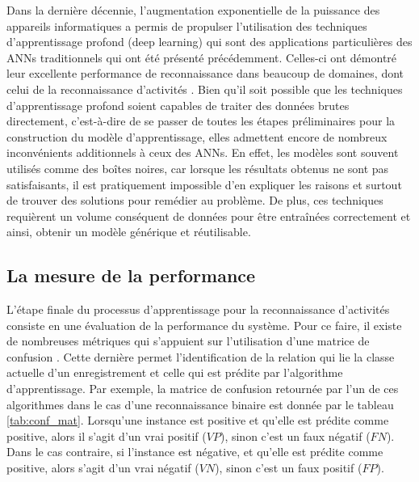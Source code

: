 Dans la dernière décennie, l'augmentation exponentielle de la puissance des appareils informatiques a permis de propulser l'utilisation des techniques d'apprentissage profond (deep learning) qui sont des applications particulières des \acsp{ANN} traditionnels qui ont été présenté précédemment. Celles-ci ont démontré leur excellente performance de reconnaissance dans beaucoup de domaines, dont celui de la reconnaissance d'activités \citep{Yang2015, Li2016, Wang2018}. Bien qu'il soit possible que les techniques d'apprentissage profond soient capables de traiter des données brutes directement, c'est-à-dire de se passer de toutes les étapes préliminaires pour la construction du modèle d'apprentissage, elles admettent encore de nombreux inconvénients additionnels à ceux des \acsp{ANN}. En effet, les modèles sont souvent utilisés comme des boîtes noires, car lorsque les résultats obtenus ne sont pas satisfaisants, il est pratiquement impossible d'en expliquer les raisons et surtout de trouver des solutions pour remédier au problème. De plus, ces techniques requièrent un volume conséquent de données pour être entraînées correctement et ainsi, obtenir un modèle générique et réutilisable.

\subsection{La mesure de la performance}

L'étape finale du processus d'apprentissage pour la reconnaissance d'activités consiste en une évaluation de la performance du système. Pour ce faire, il existe de nombreuses métriques qui s'appuient sur l'utilisation d'une matrice de confusion \citep{Fawcett2006}. Cette dernière permet l'identification de la relation qui lie la classe actuelle d'un enregistrement et celle qui est prédite par l'algorithme d'apprentissage. Par exemple, la matrice de confusion retournée par l'un de ces algorithmes dans le cas d'une reconnaissance binaire est donnée par le tableau \ref{tab:conf_mat}. Lorsqu'une instance est positive et qu'elle est prédite comme positive, alors il s'agit d'un vrai positif ($VP$), sinon c'est un faux négatif ($FN$). Dans le cas contraire, si l'instance est négative, et qu'elle est prédite comme positive, alors s'agit d'un vrai négatif ($VN$), sinon c'est un faux positif ($FP$).

